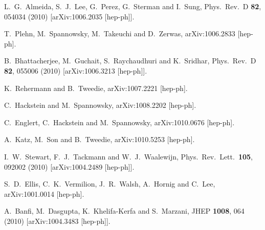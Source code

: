 \documentclass{JHEP3}
\begin{document}
\begin{thebibliography}{99}
 L.~G.~Almeida, S.~J.~Lee, G.~Perez, G.~Sterman and I.~Sung,
 Phys.\ Rev.\  D {\bf 82}, 054034 (2010)
 [arXiv:1006.2035 [hep-ph]].

 T.~Plehn, M.~Spannowsky, M.~Takeuchi and D.~Zerwas,
 arXiv:1006.2833 [hep-ph].

 B.~Bhattacherjee, M.~Guchait, S.~Raychaudhuri and K.~Sridhar,
 Phys.\ Rev.\  D {\bf 82}, 055006 (2010)
 [arXiv:1006.3213 [hep-ph]].

 K.~Rehermann and B.~Tweedie,
 arXiv:1007.2221 [hep-ph].

 C.~Hackstein and M.~Spannowsky,
 arXiv:1008.2202 [hep-ph].

 C.~Englert, C.~Hackstein and M.~Spannowsky,
 arXiv:1010.0676 [hep-ph].

  A.~Katz, M.~Son and B.~Tweedie,
  arXiv:1010.5253 [hep-ph].

 I.~W.~Stewart, F.~J.~Tackmann and W.~J.~Waalewijn,
 Phys.\ Rev.\ Lett.\  {\bf 105}, 092002 (2010)
 [arXiv:1004.2489 [hep-ph]].

  S.~D.~Ellis, C.~K.~Vermilion, J.~R.~Walsh, A.~Hornig and C.~Lee,
  arXiv:1001.0014 [hep-ph].

  A.~Banfi, M.~Dasgupta, K.~Khelifa-Kerfa and S.~Marzani,
  JHEP {\bf 1008}, 064 (2010)
  [arXiv:1004.3483 [hep-ph]].



\end{thebibliography}
\end{document}
